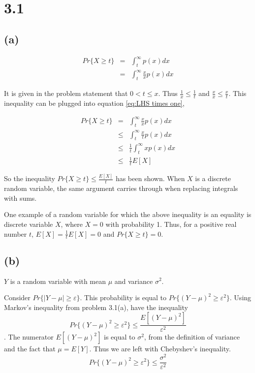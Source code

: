 \documentclass[12pt]{article}
\begin{document}
\section*{3.1}

\subsection*{(a)}

\begin{eqnarray}
    Pr \{ X \geq t \} &=&  \int_t^\infty p(x)dx \nonumber \\
    &=& \int_t^\infty \frac{x}{x}p(x)dx
    \label{eq:LHS times one}
\end{eqnarray}

It is given in the problem statement that $0 < t \leq x$.
Thus $\frac{1}{x} \leq \frac{1}{t}$ and $\frac{x}{x} \leq \frac{x}{t}$. 
This inequality can be plugged into equation \ref{eq:LHS times one},

\begin{eqnarray}
    Pr \{ X \geq t \} 
        &=&  \int_t^\infty \frac{x}{x}p(x)dx \nonumber \\
        &\leq& \int_t^\infty \frac{x}{t}p(x)dx \nonumber \\
        &\leq& \frac{1}{t} \int_t^\infty xp(x)dx \nonumber \\
        &\leq& \frac{1}{t} E[X]
    \label{eq:3.1a finished}
\end{eqnarray}

So the inequality $Pr \{ X \geq t \} \leq \frac{E[X]}{t}$ has been shown.
When $X$ is a discrete random variable, the same argument carries through
when replacing integrals with sums.

One example of a random variable for which the above inequality is an
equality is discrete variable $X$, where $X=0$ with probability 1. 
Thus, for a positive real number $t$, 
$E[X] = \frac{1}{t}E[X] =  0$ and $Pr \{ X \geq t \} = 0$.

\subsection*{(b)}

$Y$ is a random variable with mean $\mu$ and variance $\sigma^2$.

Consider $Pr\{|Y-\mu| \geq \varepsilon\}$. 
This probability is equal to $Pr\{(Y-\mu)^2 \geq \varepsilon^2\}$.
Using Markov's inequality from problem 3.1(a), have the inequality
\begin{equation}
    Pr\{(Y-\mu)^2 \geq \varepsilon^2\} \leq \frac{E[(Y-\mu)^2]}{\varepsilon^2}
    \label{eq:instatiate 3.1a}
\end{equation}
. The numerator $E[(Y-\mu)^2]$ is equal to $\sigma^2$, from the definition
of variance and the fact that $\mu = E[Y]$. Thus we are left with
Chebyshev's inequality.
\begin{equation}
    Pr\{(Y-\mu)^2 \geq \varepsilon^2\} \leq \frac{\sigma^2}{\varepsilon^2}
    \label{chebyshev}
\end{equation}
\end{document}
